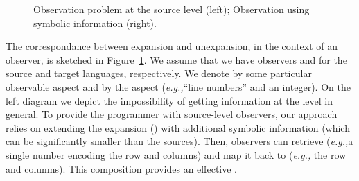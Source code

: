 \documentclass[preprint]{llncs}
\newcommand{\eg}{\emph{e.g.,\xspace}}
\begin{document}
\begin{figure}[t]
    \centering
    \begin{minipage}{0.45\linewidth}
    \end{minipage}
    \begin{minipage}{0.45\linewidth}
    \end{minipage}
    \caption{Observation problem at the source level (left);
      Observation using symbolic information (right).}
    \label{fig:unexpansion}
\end{figure} 

The correspondance between expansion and unexpansion, in the context
of an observer, is sketched in Figure~\ref{fig:unexpansion}. We assume
that we have observers  and  for
the source and target languages, respectively. We denote by  some
particular observable aspect and by  the aspect (\eg ``line
numbers'' and an integer). On the left diagram we depict the
impossibility of getting information at the  level in
general. 
To provide the programmer with source-level observers, our approach
relies on extending the expansion ()
with additional symbolic information (which can be significantly 
smaller than the sources). Then, observers
 can retrieve  (\eg a single
number encoding the row and columns) and map it back to  (\eg
the row and columns). This composition provides an effective
.
\end{document}
